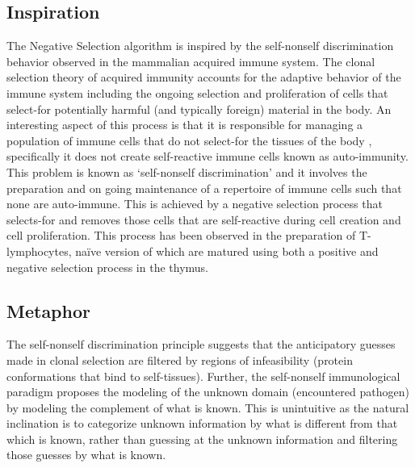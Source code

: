 \subsection{Inspiration}
The Negative Selection algorithm is inspired by the self-nonself discrimination behavior observed in the mammalian acquired immune system.
The clonal selection theory of acquired immunity accounts for the adaptive behavior of the immune system including the ongoing selection and proliferation of cells that select-for potentially harmful (and typically foreign) material in the body.
An interesting aspect of this process is that it is responsible for managing a population of immune cells that do not select-for the tissues of the body , specifically it does not create self-reactive immune cells known as auto-immunity. 
This problem is known as `self-nonself discrimination' and it involves the preparation and on going maintenance of a repertoire of immune cells such that none are auto-immune. This is achieved by a negative selection process that selects-for and removes those cells that are self-reactive during cell creation and cell proliferation. This process has been observed in the preparation of T-lymphocytes, na\"ive version of which are matured using both a positive and negative selection process in the thymus.

\subsection{Metaphor}
The self-nonself discrimination principle suggests that the anticipatory guesses made in clonal selection are filtered by regions of infeasibility (protein conformations that bind to self-tissues). Further, the self-nonself immunological paradigm proposes the modeling of the unknown domain (encountered pathogen) by modeling the complement of what is known. This is unintuitive as the natural inclination is to categorize unknown information by what is different from that which is known, rather than guessing at the unknown information and filtering those guesses by what is known. 

